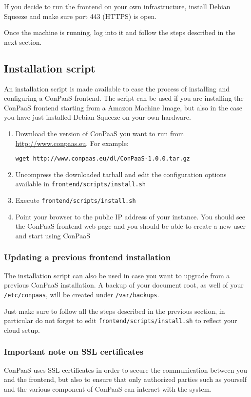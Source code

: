 \documentclass[10pt]{article}
\begin{document}
If you decide to run the frontend on your own infrastructure, install Debian
Squeeze and make sure port 443 (HTTPS) is open.

Once the machine is running, log into it and follow the steps described in the
next section.

\subsection{Installation script}
\label{sec:frontend-installation-script}

An installation script is made available to ease the process of installing and
configuring a ConPaaS frontend. The script can be used if you are installing
the ConPaaS frontend starting from a Amazon Machine Image, but also in the case
you have just installed Debian Squeeze on your own hardware.

\begin{enumerate}
\item Download the version of ConPaaS you want to run from
\url{http://www.conpaas.eu}. For example: 

\verb+wget http://www.conpaas.eu/dl/ConPaaS-1.0.0.tar.gz+

\item Uncompress the downloaded tarball and edit the configuration options available in \verb+frontend/scripts/install.sh+
\item Execute \verb+frontend/scripts/install.sh+
\item Point your browser to the public IP address of your instance. You should
  see the ConPaaS frontend web page and you should be able to create a new user
  and start using ConPaaS
\end{enumerate}

\subsubsection{Updating a previous frontend installation}
The installation script can also be used in case you want to upgrade from a
previous ConPaaS installation. A backup of your document root, as well of your
\verb+/etc/conpaas+, will be created under \verb+/var/backups+.

Just make sure to follow all the steps described in the previous section, in
particular do not forget to edit \verb+frontend/scripts/install.sh+ to reflect
your cloud setup.

\subsubsection{Important note on SSL certificates}
ConPaaS uses SSL certificates in order to secure the communication between you
and the frontend, but also to ensure that only authorized parties such as
yourself and the various component of ConPaaS can interact with the system.
\end{document}
